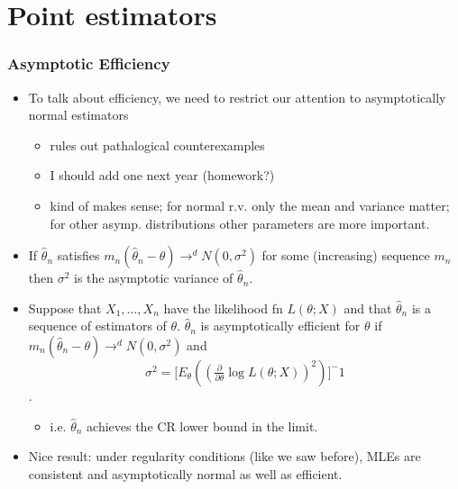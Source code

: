 

\part*{Point estimators}%

\section{Asymptotic Efficiency}

\begin{itemize}
\item To talk about efficiency, we need to restrict our attention to
      asymptotically normal estimators
\begin{itemize}
\item rules out pathalogical counterexamples
\item I should add one next year (homework?)
\item kind of makes sense; for normal r.v. only the mean and
        variance matter; for other asymp. distributions other
        parameters are more important.
\end{itemize}
\item If $\hat\theta_n$ satisfies $m_n (\hat\theta_n - \theta) \to^d
      N(0, \sigma^2)$ for some (increasing) sequence $m_n$ then
      $\sigma^2$ is the asymptotic variance of $\hat\theta_n$.
\item Suppose that $X_1,\dots,X_n$ have the likelihood fn $L(\theta;
      X)$ and that $\hat\theta_n$ is a sequence of estimators of
      $\theta$.  $\hat\theta_n$ is asymptotically efficient for
      $\theta$ if $m_n (\hat\theta_n - \theta) \to^d N(0, \sigma^2)$
      and 
      \[\sigma^2 = \Big[E_\theta ((\tfrac{\partial}{\partial \theta} \log L(\theta; X))^2)\big]^-1\].
\begin{itemize}
\item i.e. $\hat\theta_n$ achieves the CR lower bound in the limit.
\end{itemize}
\item Nice result: under regularity conditions (like we saw before),
      MLEs are consistent and asymptotically normal as well as
      efficient.
\end{itemize}

